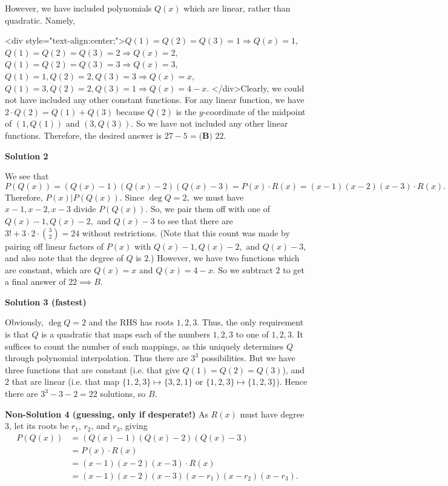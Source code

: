 \begin{enumerate}
 
However, we have included polynomials $Q(x)$ which are linear, rather than quadratic. Namely,

 <div style="text-align:center;">$Q(1)=Q(2)=Q(3)=1 \Rightarrow Q(x)=1,$
$Q(1)=Q(2)=Q(3)=2 \Rightarrow Q(x)=2,$
$Q(1)=Q(2)=Q(3)=3 \Rightarrow Q(x)=3,$
$Q(1)=1, Q(2)=2, Q(3)=3 \Rightarrow Q(x)=x,$
$Q(1)=3, Q(2)=2, Q(3)=1 \Rightarrow Q(x)=4-x.$
</div>Clearly, we could not have included any other constant functions. For any linear function, we have $2\cdot Q(2) = Q(1) + Q(3)$ because $Q(2)$ is the $y$-coordinate of the midpoint of $(1, Q(1))$ and $(3, Q(3))$. So we have not included any other linear functions. Therefore, the desired answer is $27 - 5 = \boxed{\textbf{(B) }22}$.

 



\textbf{Solution 2}

We see that 
 \[P(Q(x))=(Q(x)-1)(Q(x)-2)(Q(x)-3)=P(x)\cdot R(x)=(x-1)(x-2)(x-3)\cdot R(x).\]Therefore, $P(x) | P(Q(x))$.  Since $\deg Q = 2,$ we must have $x-1, x-2, x-3$ divide $P(Q(x))$. So, we pair them off with one of $Q(x)-1, Q(x)-2,$ and $Q(x)-3$ to see that there are $3!+3 \cdot 2 \cdot \binom{3}{2} = 24$ without restrictions. (Note that this count was made by pairing off linear factors of $P(x)$ with $Q(x)-1, Q(x)-2,$ and $Q(x)-3$, and also note that the degree of $Q$ is $2$.) However, we have two functions which are constant, which are $Q(x) = x$ and $Q(x) = 4-x$. So we subtract $2$ to get a final answer of $\boxed{22} \implies \boxed{B}$. 

 



\textbf{Solution 3 (fastest)}

Obviously, $\deg Q = 2$ and the RHS has roots $1, 2, 3$. Thus, the only requirement is that $Q$ is a quadratic that maps each of the numbers $1, 2, 3$ to one of ${1, 2, 3}.$ It suffices to count the number of such mappings, as this uniquely determines $Q$ through polynomial interpolation. Thus there are $3^3$ possibilities. But we have three functions that are constant (i.e. that give $Q(1) =Q(2) = Q(3)$), and $2$ that are linear (i.e. that map $\{1, 2, 3\} \mapsto \{3, 2, 1\}$ or $\{1, 2, 3\} \mapsto \{1, 2, 3\}$). Hence there are $3^3-3-2 = \boxed{22}$ solutions, so $\boxed{B}$.

 \textbf{Non-Solution 4 (guessing, only if desperate!)} As $R(x)$ must have degree $3$, let its roots be $r_1$, $r_2$, and $r_3$, giving
 \begin{align*}P(Q(x)) &= (Q(x)-1)(Q(x)-2)(Q(x)-3) \\ &= P(x)\cdot R(x) \\ &= (x-1)(x-2)(x-3) \cdot R(x) \\ &= \left(x-1\right)\left(x-2\right)\left(x-3\right)\left(x-r_1\right)\left(x-r_2\right)\left(x-r_3\right).\end{align*}



\end{enumerate}
